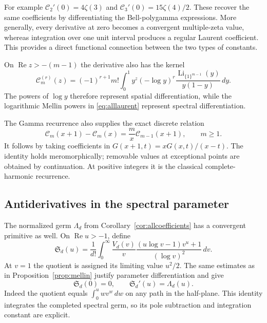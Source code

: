 \documentclass[11pt,a4paper]{article}
\numberwithin{equation}{section}
\theoremstyle{definition}
\DeclareMathOperator{\Li}{Li}
\newcommand{\CM}{\mathcal C}
\newcommand{\re}{\operatorname{Re}}
\begin{document}
For example $\CM_2'(0)=4\zeta(3)$ and
$\CM_3'(0)=15\zeta(4)/2$. These recover the same coefficients
by differentiating the Bell-polygamma expressions. More generally,
every derivative at zero becomes a convergent multiple-zeta value,
whereas integration over one unit interval produces a regular
Laurent coefficient. This provides a direct functional connection
between the two types of constants.

On $\re z>-(m-1)$ the derivative also has the kernel
\begin{equation}\label{eq:Cderivative_kernel}
 \CM_m^{(r)}(z)=(-1)^{r+1}m!
  \int_0^1y^z(-\log y)^r
       \frac{\Li_{\{1\}^{m-1}}(y)}{y(1-y)}\,dy.
\end{equation}
The powers of $\log y$ therefore represent spatial differentiation,
while the logarithmic Mellin powers in \eqref{eq:alllaurent}
represent spectral differentiation.

The Gamma recurrence also supplies the exact discrete relation
\begin{equation}\label{eq:Cshift}
 \CM_m(x+1)-\CM_m(x)=\frac m x\CM_{m-1}(x+1),\qquad m\ge1.
\end{equation}
It follows by taking coefficients in
$G(x+1,t)=xG(x,t)/(x-t)$. The identity holds meromorphically;
removable values at exceptional points are obtained by continuation.
At positive integers it is the classical complete-harmonic recurrence.

\subsection{Antiderivatives in the spectral parameter}

The normalized germ $\Lambda_d$ from Corollary~\ref{cor:allcoefficients}
has a convergent primitive as well. On $\re u>-1$, define
\begin{equation}\label{eq:spectral_primitive}
 \mathfrak S_d(u)=\frac1{d!}\int_0^\infty\frac{V_d(v)}v
   \frac{(u\log v-1)v^u+1}{(\log v)^2}\,dv.
\end{equation}
At $v=1$ the quotient is assigned its limiting value $u^2/2$.
The same estimates as in Proposition~\ref{prop:mellin} justify
parameter differentiation and give
\begin{equation}\label{eq:spectral_primitive_derivative}
 \mathfrak S_d(0)=0,\qquad \mathfrak S_d'(u)=\Lambda_d(u).
\end{equation}
Indeed the quotient equals $\int_0^u wv^w\,dw$ on any path in the
half-plane. This identity integrates the completed spectral germ,
so its pole subtraction and integration constant are explicit.
\end{document}
